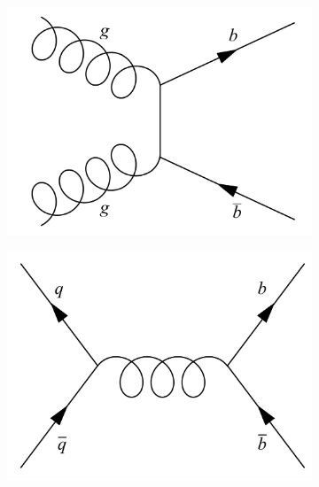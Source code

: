\begin{figure}[tbp]
  \centering
  \begin{subfigure}[b]{0.3\textwidth}
    \includegraphics[width=\textwidth]{./Figs/LHC_LHCb/bbbar_prod_1.pdf}
    \caption{}
    \label{fig:}   
  \end{subfigure}             
  \begin{subfigure}[b]{0.3\textwidth}
    \includegraphics[width=\textwidth]{./Figs/LHC_LHCb/bbbar_prod_2.pdf}
    \caption{}
    \label{fig:}
  \end{subfigure}             
  \begin{subfigure}[b]{0.3\textwidth}

\end{subfigure}
\end{figure}
